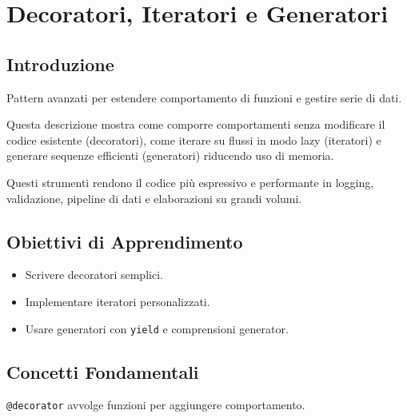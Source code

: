 \chapter{Decoratori, Iteratori e Generatori}

\section{Introduzione}
Pattern avanzati per estendere comportamento di funzioni e gestire serie di dati.

Questa descrizione mostra come comporre comportamenti senza modificare il codice esistente (decoratori), come iterare su flussi in modo lazy (iteratori) e generare sequenze efficienti (generatori) riducendo uso di memoria.

Questi strumenti rendono il codice più espressivo e performante in logging, validazione, pipeline di dati e elaborazioni su grandi volumi.

\section{Obiettivi di Apprendimento}
\begin{itemize}
  \item Scrivere decoratori semplici.
  \item Implementare iteratori personalizzati.
  \item Usare generatori con \texttt{yield} e comprensioni generator.
\end{itemize}

\section{Concetti Fondamentali}
\begin{tcolorbox}[title=Decoratori]
\texttt{@decorator} avvolge funzioni per aggiungere comportamento.
\end{tcolorbox}

